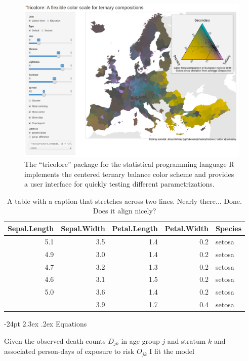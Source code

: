 \documentclass[10pt,twoside,reqno]{article}
\makeatletter
\def\cnstmaxfigwidth{
      \ifdim \Gin@nat@width>\linewidth
        \linewidth
      \else \Gin@nat@width
      \fi
    }
\let\Oldincludegraphics\includegraphics
\renewcommand{\includegraphics}[1]{\Oldincludegraphics[width=\cnstmaxfigwidth]{#1}}
\renewcommand\section{\@startsection {section}{1}{\z@}%
                                   {-24pt}%
                                   {2.3ex \@plus.2ex}%
                                   {\normalfont\large\bfseries}}
\makeatother
\begin{document}
\begin{figure}
\centering
\includegraphics{figure2.png}
\caption{The ``tricolore'' package for the statistical programming language R implements the centered ternary balance color scheme and provides a user interface for quickly testing different parametrizations.}
\end{figure}

\begin{table}

\caption{\label{tab:unnamed-chunk-3}A table with a caption that stretches across two lines. Nearly there... Done. Does it align nicely?}
\centering
\begin{tabular}[t]{rrrrl}
\toprule
Sepal.Length & Sepal.Width & Petal.Length & Petal.Width & Species\\
\midrule
5.1 & 3.5 & 1.4 & 0.2 & setosa\\
4.9 & 3.0 & 1.4 & 0.2 & setosa\\
4.7 & 3.2 & 1.3 & 0.2 & setosa\\
4.6 & 3.1 & 1.5 & 0.2 & setosa\\
5.0 & 3.6 & 1.4 & 0.2 & setosa\\
\addlinespace
5.4 & 3.9 & 1.7 & 0.4 & setosa\\
\bottomrule
\end{tabular}
\end{table}

\hypertarget{equations}{%
\section{Equations}\label{equations}}

Given the observed death counts \(D_{jk}\) in age group \(j\) and stratum \(k\) and associated person-days of exposure to risk \(O_{jk}\) I fit the model
\end{document}
